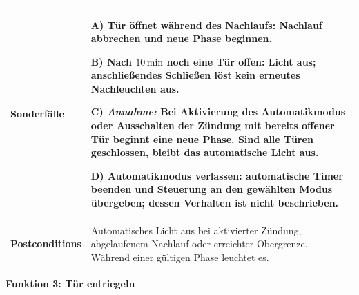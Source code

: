 \begin{loesung}
\begin{tabularx}{\linewidth}{|p{3.3cm}|X|}
\textbf{Sonderfälle} &
A) Tür öffnet während des Nachlaufs: Nachlauf abbrechen und neue Phase beginnen.
\par B) Nach $10\,\mathrm{min}$ noch eine Tür offen: Licht aus; anschließendes Schließen löst kein erneutes Nachleuchten aus.
\par C) \emph{Annahme:} Bei Aktivierung des Automatikmodus oder Ausschalten der Zündung mit bereits offener Tür beginnt eine neue Phase. Sind alle Türen geschlossen, bleibt das automatische Licht aus.
\par D) Automatikmodus verlassen: automatische Timer beenden und Steuerung an den gewählten Modus übergeben; dessen Verhalten ist nicht beschrieben. \\ \hline
\textbf{Postconditions} & Automatisches Licht aus bei aktivierter Zündung, abgelaufenem Nachlauf oder erreichter Obergrenze. Während einer gültigen Phase leuchtet es. \\ \hline
\end{tabularx}
\endgroup

\clearpage
\textbf{Funktion 3: Tür entriegeln}


\end{loesung}
